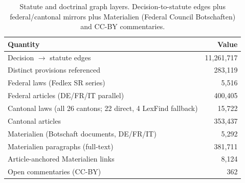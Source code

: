 \begin{table}[t]
\centering
\caption{Statute and doctrinal graph layers. Decision-to-statute edges plus federal/cantonal mirrors plus Materialien (Federal Council Botschaften) and CC-BY commentaries.}
\label{tab:statute_graph}
\small
\begin{tabular}{l r}
\toprule
\textbf{Quantity} & \textbf{Value} \\
\midrule
Decision $\to$ statute edges & 11,261,717 \\
Distinct provisions referenced & 283,119 \\
\addlinespace
Federal laws (Fedlex SR series) & 5,516 \\
Federal articles (DE/FR/IT parallel) & 400,405 \\
Cantonal laws (all 26 cantons; 22 direct, 4 LexFind fallback) & 15,722 \\
Cantonal articles & 353,437 \\
\addlinespace
Materialien (Botschaft documents, DE/FR/IT) & 5,292 \\
Materialien paragraphs (full-text) & 381,711 \\
Article-anchored Materialien links & 8,124 \\
\addlinespace
Open commentaries (CC-BY) & 362 \\
\bottomrule
\end{tabular}
\end{table}
